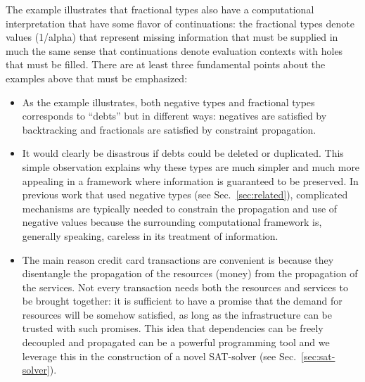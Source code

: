 \documentclass[preprint]{sigplanconf}
\begin{document}

The example illustrates that fractional types also have a computational
interpretation that have some flavor of continuations: the fractional types
denote values ({{1/alpha}}) that represent missing information that must be
supplied in much the same sense that continuations denote evaluation contexts
with holes that must be filled.  There are at least three fundamental points
about the examples above that must be emphasized:

\begin{itemize}
\item 
As the example illustrates, both negative types and fractional types
corresponds to ``debts'' but in different ways: negatives are satisfied
by backtracking and fractionals are satisfied by constraint
propagation.

\item 
It would clearly be disastrous if debts could be deleted or
duplicated. This simple observation explains why these types are much
simpler and much more appealing in a framework where information is
guaranteed to be preserved. In previous work that used negative types
(see Sec.~\ref{sec:related}), complicated mechanisms are typically
needed to constrain the propagation and use of negative values because
the surrounding computational framework is, generally speaking,
careless in its treatment of information.

\item The main reason credit card transactions are convenient is because they
  disentangle the propagation of the resources (money) from the propagation
  of the services. Not every transaction needs both the resources and
  services to be brought together: it is sufficient to have a promise that
  the demand for resources will be somehow satisfied, as long as the
  infrastructure can be trusted with such promises. This idea that
  dependencies can be freely decoupled and propagated can be a powerful
  programming tool and we leverage this in the construction of a novel
  SAT-solver (see Sec.~\ref{sec:sat-solver}).


\end{itemize}
\end{document}

